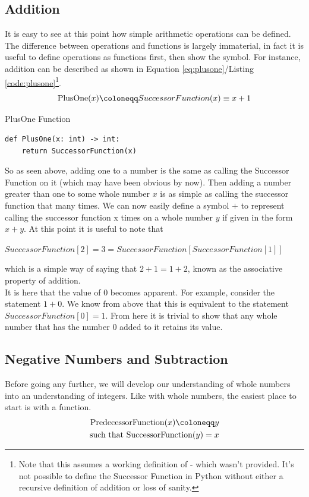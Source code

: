 \subsection{Addition}

It is easy to see at this point how simple arithmetic operations can be defined. The difference between operations and functions is largely immaterial, in fact it is useful to define operations as functions first, then show the symbol. For instance, addition can be described as shown in Equation \ref{eq:plusone}/Listing \ref{code:plusone}\footnote{Note that this assumes a working definition of  - which wasn't provided. It's not possible to define the Successor Function in Python without either a recursive definition of addition or loss of sanity.}.
\begin{equation}\label{eq:plusone}
\textnormal{PlusOne}(x) \coloneqq SuccessorFunction(x) \equiv x+1
\end{equation}
\begin{listing}[H]
\caption{PlusOne Function}\label{code:plusone}
\begin{verbatim}
def PlusOne(x: int) -> int:
	return SuccessorFunction(x)
\end{verbatim}
\end{listing}
So as seen above, adding one to a number is the same as calling the Successor Function on it (which may have been obvious by now). Then adding a number greater than one to some whole number $x$ is as simple as calling the successor function that many times. We can now easily define a symbol $+$ to represent calling the successor function x times on a whole number $y$ if given in the form $x+y$. At this point it is useful to note that
\begin{center}
$SuccessorFunction[2]=3=SuccessorFunction[SuccessorFunction[1]]$
\end{center}
which is a simple way of saying that $2+1=1+2$, known as the associative property of addition. \\
It is here that the value of $0$ becomes apparent. For example, consider the statement $1+0$. We know from above that this is equivalent to the statement \\ $SuccessorFunction[0]=1$. From here it is trivial to show that any whole number that has the number $0$ added to it retains its value.

\subsection{Negative Numbers and Subtraction}
Before going any further, we will develop our understanding of whole numbers into an understanding of integers. Like with whole numbers, the easiest place to start is with a function.
\begin{align}\label{func:predecessor}
\textnormal{PredecessorFunction}(x) \coloneqq y \\
\textnormal{such that SuccessorFunction}(y) = x
\end{align}

